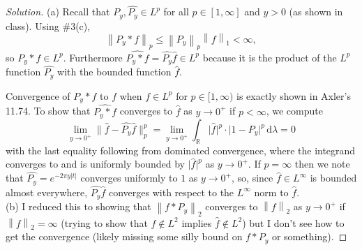 \documentclass[10pt]{article}
\newcommand{\dd}{\,\mathrm{d}}
\providecommand{\RR}{\mathbb R}
\newcommand{\what}{\widehat}
\newenvironment{soln}{\begin{proof}[Solution]}{\end{proof}}
\providecommand{\abs}[1]{\left\lvert #1\right\rvert}
\providecommand{\smabs}[1]{\lvert #1\rvert}
\providecommand{\norm}[1]{\left\| #1\right\|}
\providecommand{\smnorm}[1]{\| #1\|}
\begin{document}
\begin{soln}
    (a) Recall that $P_y, \what{P_y}\in L^p$ for all $p\in[1,\infty]$ and $y>0$
    (as shown in class).
    Using \#3(c),
    \[
	\norm{P_y*f}_p \le \norm{P_y}_p\norm{f}_1 < \infty,
    \]
    so $P_y*f\in L^p$. Furthermore $\what{P_y*f} = \what{P_y}\what f \in L^p$
    because it is the product of the $L^p$ function $\what{P_y}$
    with the bounded function $\what f$.

    Convergence of $P_y*f$ to $f$ when $f\in L^p$ for $p\in[1,\infty)$
    is exactly shown in Axler's 11.74.
    To show that $\what{P_y*f}$ converges to $\what f$ as $y\to 0^+$ if $p<\infty$,
    we compute
    \begin{equation*}
	\lim_{y\to 0^+} \smnorm{\what f - \what{P_y}\what f}_p^p
	= \lim_{y\to0^+}\int_\RR \smabs{\what f}^p\cdot\smabs{1-\what{P_y}}^p\dd\lambda
	= 0
    \end{equation*}
    with the last equality following from dominated convergence,
    where the integrand converges to and is uniformly bounded by
    $\smabs{\what f}^p$ as $y\to 0^+$.
    If $p=\infty$ then we note that $\what{P_y} = e^{-2\pi y\abs{t}}$
    converges uniformly to $1$ as $y\to0^+$, so, since $\what f\in L^\infty$
    is bounded almost everywhere, $\what{P_y}\what f$ converges
    with respect to the $L^\infty$ norm to $\what f$.
    \\

    (b) I reduced this to showing that
    $\norm{f*P_y}_2$ converges to $\norm{f}_2$ as $y\to 0^+$
    if $\norm{f}_2 = \infty$ (trying to show that
    $f\notin L^2$ implies $\what f\notin L^2$)
    but I don't see how to get the convergence
    (likely missing some silly bound on $f*P_y$ or something).
\end{soln}
\end{document}
